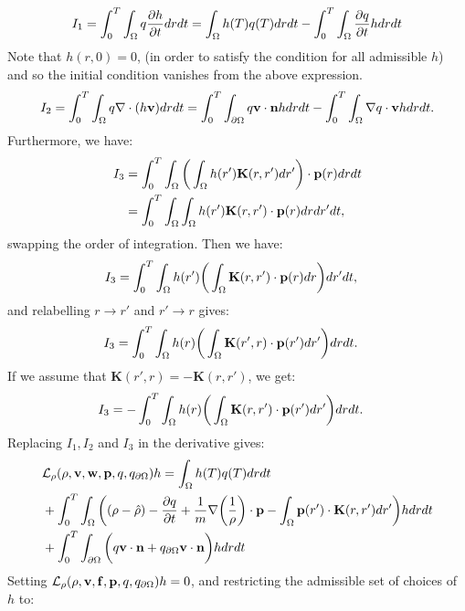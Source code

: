 \begin{align*}
I_1 = \int_0^T \int_\Omega q\frac{\partial h}{\partial t} dr dt = \int_\Omega h(T) q(T) dr dt - \int_0^T \int_\Omega  \frac{\partial q}{\partial t}h dr dt
\end{align*}
Note that ${h}(r,0)=0$, (in order to satisfy the condition for all admissible ${h}$) and so the initial condition vanishes from the above expression.
\begin{align*}
I_2= \int_0^T \int_\Omega q\nabla \cdot (h \mathbf{v}) dr dt = \int_0^T \int_{\partial \Omega} q \mathbf{v} \cdot \mathbf{n} h dr dt - \int_0^T \int_\Omega \nabla q \cdot \mathbf{v} h dr dt.
\end{align*}
Furthermore, we have:
\begin{align*}
I_{3}&= \int_0^T \int_\Omega \bigg(\int_\Omega  h(r') \mathbf{K}(r,r')dr'\bigg) \cdot \mathbf{p}(r) drdt\\
&=\int_0^T \int_\Omega \int_\Omega h(r') \mathbf{K}(r,r') \cdot \mathbf{p}(r) drdr'dt,
\end{align*}
swapping the order of integration. Then we have:
\begin{align*}
I_{3}&= \int_0^T \int_\Omega  h(r')\bigg(\int_\Omega  \mathbf{K}(r,r')\cdot \mathbf{p}(r) dr \bigg)dr'dt,
\end{align*}
and relabelling $r \to r'$ and $r' \to r$ gives:
\begin{align*}
I_{3}&= \int_0^T \int_\Omega  h(r)\bigg(\int_\Omega  \mathbf{K}(r',r) \cdot \mathbf{p}(r') dr' \bigg)drdt.
\end{align*}
If we assume that $\mathbf{K}(r',r) = - \mathbf{K}(r,r')$, we get:
\begin{align*}
I_{3}&= -\int_0^T \int_\Omega  h(r)\bigg(\int_\Omega  \mathbf{K}(r,r') \cdot \mathbf{p}(r') dr' \bigg)drdt.
\end{align*}
Replacing $I_1, I_2$ and $I_3$ in the derivative gives:
\begin{align*}
&\mathcal{L}_\rho(\rho,\mathbf{v},\mathbf{w},\mathbf{p},q,{q}_{\partial \Omega})h = \int_\Omega h(T) q(T) dr dt  \\
&+ \int_0^T \int_\Omega \bigg( (\rho - \hat {\rho}) - \frac{\partial q}{\partial t} +\frac{1}{m}\nabla \bigg(\frac{1}{\rho}\bigg)\cdot \mathbf{p} -  \int_\Omega  \mathbf{p}(r') \cdot\mathbf{K}(r,r')   dr'  \bigg)hdr dt\\
&+\int_0^T \int_{\partial \Omega} \bigg(  q \mathbf{v} \cdot \mathbf{n}   +{q}_{\partial \Omega} \mathbf{v} \cdot \mathbf{n}\bigg)h  dr dt
\end{align*}
Setting $\mathcal{L}_\rho(\rho,\mathbf{v},\mathbf{f},\mathbf{p},q,{q}_{\partial \Omega})h=0$, and restricting the admissible set of choices of $h$ to:
